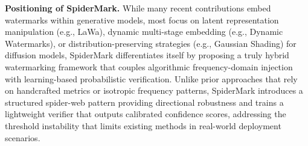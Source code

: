 \noindent\textbf{Positioning of SpiderMark.}
While many recent contributions embed watermarks within generative models, most focus 
on latent representation manipulation (e.g., LaWa), dynamic multi-stage embedding 
(e.g., Dynamic Watermarks), or distribution-preserving strategies (e.g., Gaussian 
Shading) for diffusion models, SpiderMark differentiates itself by proposing a truly 
hybrid watermarking framework that couples algorithmic frequency-domain injection with 
learning-based probabilistic verification. Unlike prior approaches that rely on 
handcrafted metrics or isotropic frequency patterns, SpiderMark introduces a structured 
spider-web pattern providing directional robustness and trains a lightweight verifier 
that outputs calibrated confidence scores, addressing the threshold instability that 
limits existing methods in real-world deployment scenarios.